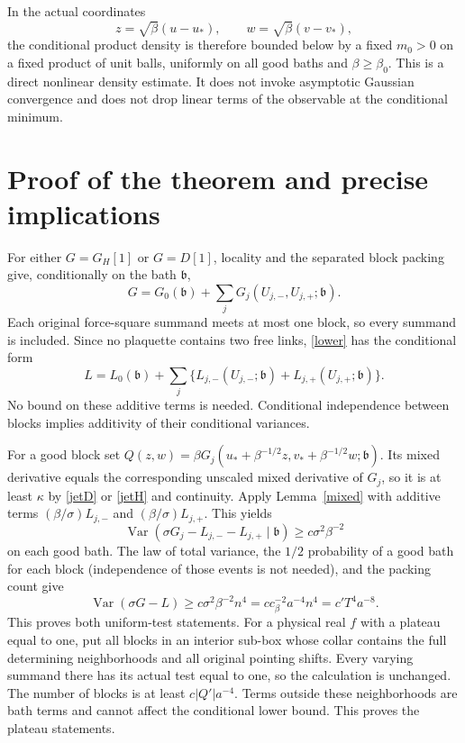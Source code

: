 \documentclass[11pt]{article}
\newcommand{\Var}{\operatorname{Var}}
\begin{document}
In the actual coordinates
\[
 z=\sqrt\beta(u-u_*),\qquad w=\sqrt\beta(v-v_*),
\]
the conditional product density is therefore bounded below by a fixed
$m_0>0$ on a fixed product of unit balls, uniformly on all good baths and
$\beta\ge\beta_0$. This is a direct nonlinear density estimate. It does
not invoke asymptotic Gaussian convergence and does not drop linear terms
of the observable at the conditional minimum.

\section{Proof of the theorem and precise implications}
For either $G=G_H[1]$ or $G=D[1]$, locality and the separated block packing
give, conditionally on the bath $\mathfrak b$,
\[
 G=G_0(\mathfrak b)+\sum_jG_j(U_{j,-},U_{j,+};\mathfrak b).
\]
Each original force-square summand meets at most one block, so every
summand is included. Since no plaquette contains two free links, \eqref{lower}
has the conditional form
\[
 L=L_0(\mathfrak b)+\sum_j\{L_{j,-}(U_{j,-};\mathfrak b)
                            +L_{j,+}(U_{j,+};\mathfrak b)\}.
\]
No bound on these additive terms is needed. Conditional independence between
blocks implies additivity of their conditional variances.

For a good block set
$Q(z,w)=\beta G_j(u_*+\beta^{-1/2}z,v_*+\beta^{-1/2}w;\mathfrak b)$.
Its mixed derivative equals the corresponding unscaled mixed derivative
of $G_j$, so it is at least $\kappa$ by \eqref{jetD} or \eqref{jetH} and
continuity. Apply Lemma~\ref{mixed} with additive terms
$(\beta/\sigma)L_{j,-}$ and $(\beta/\sigma)L_{j,+}$. This yields
\[
 \Var(\sigma G_j-L_{j,-}-L_{j,+}\mid\mathfrak b)
 \ge c\sigma^2\beta^{-2}
\]
on each good bath. The law of total variance, the $1/2$ probability of a
good bath for each block (independence of those events is not needed), and
the packing count give
\[
 \Var(\sigma G-L)
 \ge c\sigma^2\beta^{-2}n^4
 =cc_\beta^{-2}a^{-4}n^4
 =c'T^4a^{-8}.
\]
This proves both uniform-test statements. For a physical real $f$ with a
plateau equal to one, put all blocks in an interior sub-box whose collar
contains the full determining neighborhoods and all original pointing
shifts. Every varying summand there has its actual test equal to one, so
the calculation is unchanged. The number of blocks is at least
$c|Q'|a^{-4}$. Terms outside these neighborhoods are bath terms and cannot
affect the conditional lower bound. This proves the plateau statements.
\end{document}
